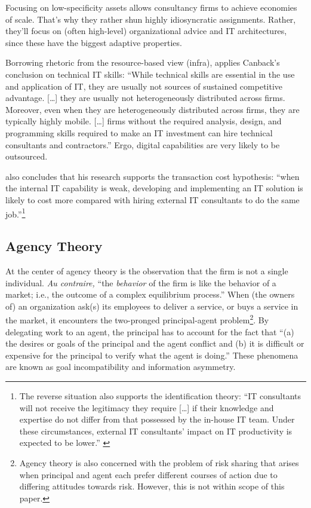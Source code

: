 \documentclass[12pt]{article}
\begin{document}
Focusing on low-specificity assets allows consultancy firms to achieve
economies of scale. That's why they rather shun highly idiosyncratic
assignments. Rather, they'll focus on (often high-level) organizational
advice and IT architectures, since these have the biggest adaptive
properties.

Borrowing rhetoric from the resource-based view (infra),
\citet[498]{mata1995} applies Canback's conclusion on technical IT
skills: ``While technical skills are essential in the use and
application of IT, they are usually not sources of sustained competitive
advantage. {[}\ldots{]} they are usually not heterogeneously distributed
across firms. Moreover, even when they are heterogeneously distributed
across firms, they are typically highly mobile. {[}\ldots{]} firms
without the required analysis, design, and programming skills required
to make an IT investment can hire technical consultants and
contractors.'' Ergo, digital capabilities are very likely to be
outsourced.

\citet[16-17]{nevo2007} also concludes that his research supports the
transaction cost hypothesis: ``when the internal IT capability is weak,
developing and implementing an IT solution is likely to cost more
compared with hiring external IT consultants to do the same
job.''\footnote{The reverse situation also supports the identification
  theory: ``IT consultants will not receive the legitimacy they require
  {[}\ldots{]} if their knowledge and expertise do not differ from that
  possessed by the in-house IT team. Under these circumstances, external
  IT consultants' impact on IT productivity is expected to be lower.''
  \citep[ 17]{nevo2007}}

\subsection{Agency Theory}\label{agency-theory}

At the center of agency theory is the observation that the firm is not a
single individual. \emph{Au contraire,} ``the \emph{behavior} of the
firm is like the behavior of a market; i.e., the outcome of a complex
equilibrium process.'' \citep[ 311]{jensen1976} When (the owners of) an
organization ask(s) its employees to deliver a service, or buys a
service in the market, it encounters the two-pronged principal-agent
problem\footnote{Agency theory is also concerned with the problem of
  risk sharing that arises when principal and agent each prefer
  different courses of action due to differing attitudes towards risk.
  \citep[ 58]{eisenhardt1989} However, this is not within scope of this
  paper.}. By delegating work to an agent, the principal has to account
for the fact that ``(a) the desires or goals of the principal and the
agent conflict and (b) it is difficult or expensive for the principal to
verify what the agent is doing.'' \citep[ 58]{eisenhardt1989} These
phenomena are known as goal incompatibility and information asymmetry.
\end{document}
